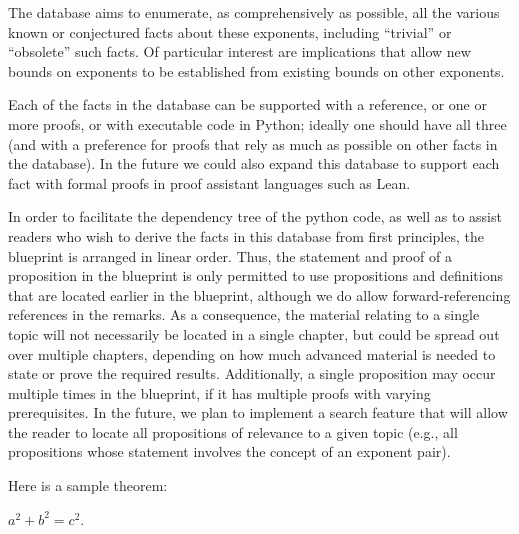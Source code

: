 The database aims to enumerate, as comprehensively as possible, all the various known or conjectured facts about these exponents, including ``trivial'' or ``obsolete'' such facts.  Of particular interest are implications that allow new bounds on exponents to be established from existing bounds on other exponents.

Each of the facts in the database can be supported with a reference, or one or more proofs, or with executable code in Python; ideally one should have all three (and with a preference for proofs that rely as much as possible on other facts in the database).  In the future we could also expand this database to support each fact with formal proofs in proof assistant languages such as Lean.

In order to facilitate the dependency tree of the python code, as well as to assist readers who wish to derive the facts in this database from first principles, the blueprint is arranged in linear order.  Thus, the statement and proof of a proposition in the blueprint is only permitted to use propositions and definitions that are located earlier in the blueprint, although we do allow forward-referencing references in the remarks.  As a consequence, the material relating to a single topic will not necessarily be located in a single chapter, but could be spread out over multiple chapters, depending on how much advanced material is needed to state or prove the required results.  Additionally, a single proposition may occur multiple times in the blueprint, if it has multiple proofs with varying prerequisites.  In the future, we plan to implement a search feature that will allow the reader to locate all propositions of relevance to a given topic (e.g., all propositions whose statement involves the concept of an exponent pair).


Here is a sample theorem:

\begin{theorem}[Test]  $a^2+b^2=c^2$.
\end{theorem}
